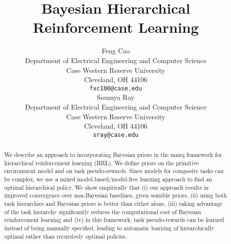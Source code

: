 \documentclass{article} %
\title{Bayesian Hierarchical Reinforcement Learning}
\author{
Feng Cao\\
Department of Electrical Engineering and Computer Science\\
Case Western Reserve University\\
Cleveland, OH 44106 \\
\texttt{fxc100@case.edu} \\
\And
Soumya Ray \\
Department of Electrical Engineering and Computer Science \\
Case Western Reserve University\\
Cleveland, OH 44106 \\
\texttt{sray@case.edu} \\
}
\begin{document}
\maketitle

\begin{abstract}
We describe an approach to incorporating Bayesian priors in the {\sc
maxq} framework for hierarchical reinforcement learning (HRL). We
define priors on the primitive environment model and on task
pseudo-rewards. Since models for composite tasks can be complex, we
use a mixed model-based/model-free learning approach to find an
optimal hierarchical policy. We show empirically that (i) our approach
results in improved convergence over non-Bayesian baselines, given
sensible priors, (ii) using both task hierarchies and Bayesian priors
is better than either alone, (iii) taking advantage of the task
hierarchy significantly reduces the computational cost of Bayesian
reinforcement learning and (iv) in this framework, task pseudo-rewards
can be learned instead of being manually specified, leading to
automatic learning of hierarchically optimal rather than recursively
optimal policies.
\end{abstract}







%
%


{\footnotesize

}
\end{document}
